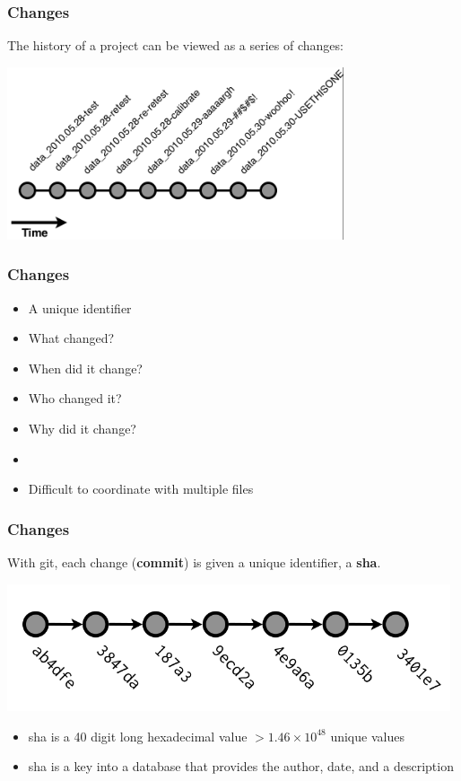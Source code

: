   \begin{frame}[t]
    \frametitle{Changes}
    The history of a project can be viewed as a series of changes:
    \begin{center}
      \includegraphics[height=2.00in]{../images/from-wickham-01.png} 
    \end{center} 
  \end{frame}

  \begin{frame}[t]
    \frametitle{Changes}
    \begin{itemize}
      \item A unique identifier
      \item What changed?
      \item When did it change?
      \item Who changed it?
      \item Why did it change?
      \item[]
      \item Difficult to coordinate with multiple files
    \end{itemize}
  \end{frame}

  \begin{frame}[t]
    \frametitle{Changes}
    With git, each change ({\bf commit}) is given a unique identifier, a {\bf
    sha}.
    \begin{center}
      \includegraphics[width=0.98\textwidth]{../images/from-wickham-02.png} 
    \end{center} 

    \begin{itemize} 
      \item sha is a 40 digit long hexadecimal value $> 1.46 \times 10^{48}$
        unique values
      \item sha is a key into a database that provides the author, date, and a
        description
    \end{itemize} 
  \end{frame}

